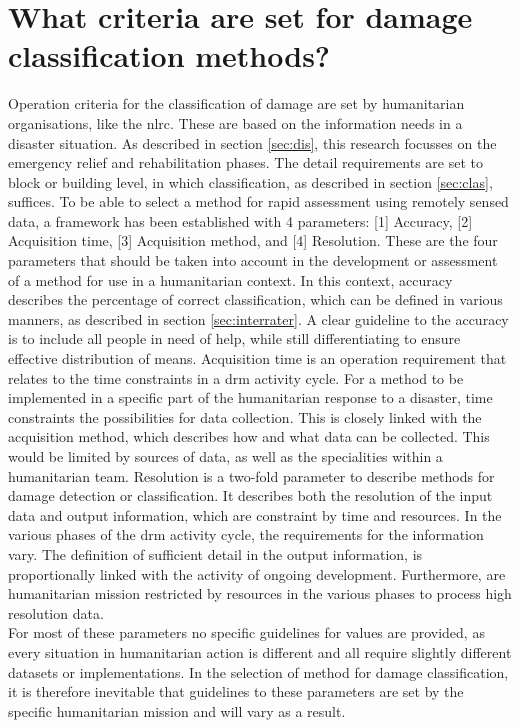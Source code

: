 \section{What criteria are set for damage classification methods?}
Operation criteria for the classification of damage are set by humanitarian organisations, like the \ac{nlrc}. These are based on the information needs in a disaster situation. As described in section \ref{sec:dis}, this research focusses on the emergency relief and rehabilitation phases. The detail requirements are set to block or building level, in which classification, as described in section \ref{sec:clas}, suffices. To be able to select a method for rapid assessment using remotely sensed data, a framework has been established with 4 parameters: [1] Accuracy, [2] Acquisition time, [3] Acquisition method, and [4] Resolution. These are the four parameters that should be taken into account in the development or assessment of a method for use in a humanitarian context. In this context, accuracy describes the percentage of correct classification, which can be defined in various manners, as described in section \ref{sec:interrater}. A clear guideline to the accuracy is to include all people in need of help, while still differentiating to ensure effective distribution of means. Acquisition time is an operation requirement that relates to the time constraints in a \ac{drm} activity cycle. For a method to be implemented in a specific part of the humanitarian response to a disaster, time constraints the possibilities for data collection. This is closely linked with the acquisition method, which describes how and what data can be collected. This would be limited by sources of data, as well as the specialities within a humanitarian team. Resolution is a two-fold parameter to describe methods for damage detection or classification. It describes both the resolution of the input data and output information, which are constraint by time and resources. In the various phases of the \ac{drm} activity cycle, the requirements for the information vary. The definition of sufficient detail in the output information, is proportionally linked with the activity of ongoing development. Furthermore, are humanitarian mission restricted by resources in the various phases to process high resolution data.\\

\noindent For most of these parameters no specific guidelines for values are provided, as every situation in humanitarian action is different and all require slightly different datasets or implementations. In the selection of method for damage classification, it is therefore inevitable that guidelines to these parameters are set by the specific humanitarian mission and will vary as a result.

